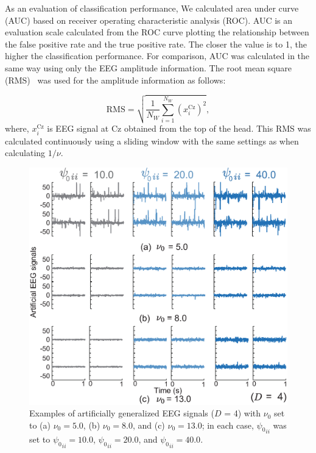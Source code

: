 \documentclass[journal]{IEEEtran}
\begin{document}
As an evaluation of classification performance, We calculated area under curve (AUC) based on receiver operating characteristic analysis (ROC).
AUC is an evaluation scale calculated from the ROC curve plotting the relationship between the false positive rate and the true positive rate. The closer the value is to 1, the higher the classification performance.
For comparison, AUC was calculated in the same way using only the EEG amplitude information. The root mean square (RMS)~\cite{Hamedi2014} was used for the amplitude information as follows:

\begin{equation}%
		\mathrm{RMS} = \sqrt{\frac{1}{N_W} \sum_{i=1}^{N_W} (x_i^\mathrm{Cz})^2},
\end{equation}
where, $x_i^\mathrm{Cz}$ is EEG signal at Cz obtained from the top of the head.
This RMS was calculated continuously using a sliding window with the same settings as when calculating $1/\nu$.

\begin{figure}[t]
\centering
\includegraphics[width=1.0\hsize]{figure/simulation_EEG_3.eps}
\caption{Examples of artificially generalized EEG signals ($D$ = 4) with $\nu_0$ set to (a) $\nu_0 = 5.0$, (b) $\nu_0 = 8.0$, and (c) $\nu_0 = 13.0$; in each case, ${{\psi_0}_{ii}}$ was set to ${{\psi_0}_{ii}} = 10.0$, ${{\psi_0}_{ii}} = 20.0$, and ${{\psi_0}_{ii}} = 40.0$.}
\label{fig:sim_EEG}
\end{figure}
\end{document}
